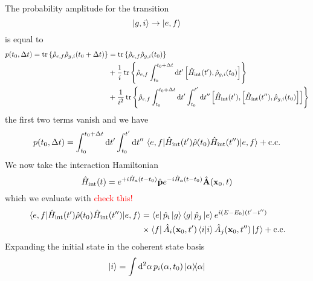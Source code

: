 The probability amplitude for the transition
\begin{equation}
	\ket{g,i}
	\to
	\ket{e,f}
\end{equation}
is equal to~\cite[p.~686]{Mandel1995}
\begin{equation}
	\begin{split}
		p(t_0,\Delta t)
		=
		\tr\left\{
			\hat\rho_{e,f}
			\hat\rho_{g,i}(t_0+\Delta t)
		\right\}
		&=
		\tr\left\{
			\hat\rho_{e,f}
			\hat\rho_{g,i}(t_0)
		\right\}
		\\
		&+
		\frac{1}{i}
		\tr\left\{
			\hat\rho_{e,f}
			\int_{t_0}^{t_0+\Delta t}
			\dd{t^\prime}
			\comm{\hat{H}_\text{int}(t^\prime)}{\hat\rho_{g,i}(t_0)}
		\right\}
		\\
		&+
		\frac{1}{i^2}
		\tr\left\{
			\hat\rho_{e,f}
			\int_{t_0}^{t_0+\Delta t}\dd{t^\prime}
			\int_{t_0}^{t^\prime}\dd{t^{\prime\prime}}
			\comm{\hat{H}_\text{int}(t^\prime)}{\comm{\hat{H}_\text{int}(t^{\prime\prime})}{\hat\rho_{g,i}(t_0)}}
		\right\}
	\end{split}
\end{equation}
the first two terms vanish and we have
\begin{equation}
	p(t_0,\Delta t)
	=
	\int_{t_0}^{t_0+\Delta t}\dd{t^\prime}
	\int_{t_0}^{t^\prime}\dd{t^{\prime\prime}}
	\expval{\hat{H}_\text{int}(t^\prime)\hat\rho(t_0)\hat{H}_\text{int}(t^{\prime\prime})}{e,f}
	+
	\text{c.c.}
\end{equation}
We now take the interaction Hamiltonian
\begin{equation}
	\hat{H}_\text{int}(t)
	=
	e^{+i\hat{H}_a(t-t_0)}
	\hat{\vb{p}}
	e^{-i\hat{H}_a(t-t_0)}
	\hat{\vb{A}}(\vb{x}_0,t)
\end{equation}
which we evaluate with \textcolor{red}{check this!}
\begin{equation}
	\begin{split}
		\expval{\hat{H}_\text{int}(t^\prime)\hat\rho(t_0)\hat{H}_\text{int}(t^{\prime\prime})}{e,f}
		&=
		\bra{e}\hat{p}_i\ket{g}
		\bra{g}\hat{p}_j\ket{e}
		e^{i(E-E_0)(t^\prime-t^{\prime\prime})}
		\\
		&\times
		\bra{f}
		\hat{A}_i(\vb{x}_0,t^\prime)
		\braket{i}
		\hat{A}_j(\vb{x}_0,t^{\prime\prime})
		\ket{f}
		+
		\text{c.c.}
	\end{split}
\end{equation}
Expanding the initial state in the coherent state basis
\begin{equation}
	\ket{i}
	=
	\int\dd[2]{\alpha}
	p_i(\alpha,t_0)
	\ketbra{\alpha}
\end{equation}
